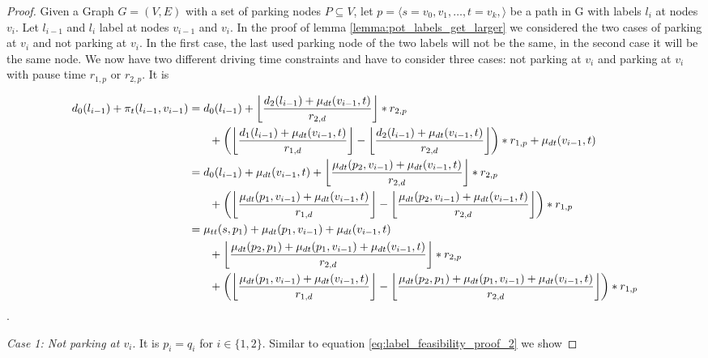 \begin{proof}
	Given a Graph $G=(V,E)$ with a set of parking nodes $P \subseteq V$, let $p = \langle s=v_0,v_1,\ldots,t=v_k, \rangle$ be a path in G with labels $l_i$ at nodes $v_i$. Let $l_{i-1}$ and $l_{i}$ label at nodes $v_{i-1}$ and $v_i$. In the proof of lemma \ref{lemma:pot_labels_get_larger} we considered the two cases of parking at $v_i$ and not parking at $v_i$. In the first case, the last used parking node of the two labels will not be the same, in the second case it will be the same node. We now have two different driving time constraints and have to consider three cases: not parking at $v_i$ and parking at $v_i$ with pause time $r_{1,p}$ or $r_{2,p}$. It is

	\begin{align}
		\begin{split}\label{eq:label_2_feasibility_proof_1}
			d_0(l_{i-1}) + \pi_t(l_{i-1},v_{i-1}) &= d_0(l_{i-1}) + \floor*{ \frac{d_2(l_{i-1}) + \drivingtime(v_{i-1},t)}{\restr_{2,d}} } * \restr_{2,p}\\
			& \phantom{{}=1} + \left(\floor*{\frac{d_1(l_{i-1}) + \drivingtime(v_{i-1},t)}{\restr_{1,d}} } - \floor*{\frac{d_2(l_{i-1}) + \drivingtime(v_{i-1},t)}{\restr_{2,d}} }\right) * \restr_{1,p} + \drivingtime(v_{i-1},t)\\
			&= d_0(l_{i-1}) + \drivingtime(v_{i-1},t) + \floor*{ \frac{\drivingtime(p_2,v_{i-1}) + \drivingtime(v_{i-1},t)}{\restr_{2,d}} } * \restr_{2,p}\\
			& \phantom{{}=1}+ \left( \floor*{ \frac{\drivingtime(p_1,v_{i-1})  + \drivingtime(v_{i-1},t)}{\restr_{1,d}} } - \floor*{ \frac{\drivingtime(p_2,v_{i-1}) + \drivingtime(v_{i-1},t)}{\restr_{2,d}} }\right) * \restr_{1,p}\\
			&= \traveltime(s, p_1) + \drivingtime(p_1,v_{i-1}) + \drivingtime(v_{i-1},t)\\
			& \phantom{{}=1} + \floor*{ \frac{\drivingtime(p_2,p_1) + \drivingtime(p_1,v_{i-1}) + \drivingtime(v_{i-1},t)}{\restr_{2,d}} } * \restr_{2,p}\\
			& \phantom{{}=1} + \left( \floor*{ \frac{\drivingtime(p_1,v_{i-1})  + \drivingtime(v_{i-1},t)}{\restr_{1,d}} } - \floor*{ \frac{\drivingtime(p_2,p_1) + \drivingtime(p_1,v_{i-1}) + \drivingtime(v_{i-1},t)}{\restr_{2,d}} }\right) * \restr_{1,p}
		\end{split}
	\end{align}.

	\emph{Case 1: Not parking at $v_i$}. It is $p_i=q_i$ for $i \in \{1,2\}$. Similar to equation \ref{eq:label_feasibility_proof_2} we show


\end{proof}
